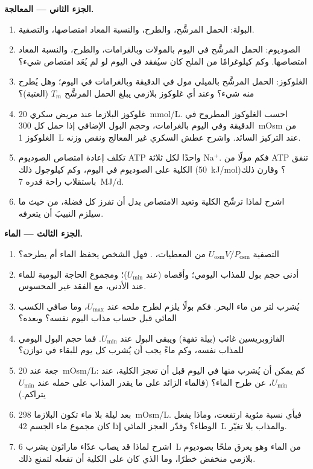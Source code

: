 \begin{problem}
\medskip
\noindent\textbf{الجزء الثاني --- المعالجة.}
\begin{enumerate}[resume]
  \item البولة: الحمل المرشَّح، والطرح، والنسبة المعاد
        امتصاصها، والتصفية.
  \item الصوديوم: الحمل المرشَّح في اليوم بالمولات وبالغرامات،
        والطرح، والنسبة المعاد امتصاصها. وكم كيلوغرامًا من
        الملح كان سيُفقد في اليوم لو لم يُعَد امتصاص شيء؟
  \item الغلوكوز: الحمل المرشَّح بالميلي مول في الدقيقة وبالغرامات في
        اليوم؛ وهل يُطرح منه شيء؟ وعند أي غلوكوز بلازمي يبلغ
        الحمل المرشَّح $T_{m}$ (العتبة)؟
  \item غلوكوز البلازما عند مريض سكري \qty{20}{mmol/L}. احسب
        الغلوكوز المطروح في الدقيقة وفي اليوم بالغرامات، وحجم
        البول الإضافي إذا حمل كل \qty{300}{mOsm} من الغلوكوز
        \qty{1}{L} عند التركيز السائد. واشرح عطش السكري غير
        المعالج ونقص وزنه.
  \item تكلف إعادة امتصاص الصوديوم ATP واحدًا لكل ثلاثة
        Na$^{+}$. فكم مولًا من ATP تنفق الكلية على الصوديوم في
        اليوم، وكم كيلوجول ذلك (\qty{50}{kJ/mol})؟ وقارن ذلك
        باستقلاب راحة قدره \qty{7}{MJ/d}.
  \item اشرح لماذا ترشّح الكلية وتعيد الامتصاص بدل أن تفرز كل
        فضلة، من حيث ما سيلزم النبيبَ أن يتعرفه.
\end{enumerate}

\medskip
\noindent\textbf{الجزء الثالث --- الماء.}
\begin{enumerate}[resume]
  \item التصفية  $U_{\text{osm}}V/P_{\text{osm}}$ من
        المعطيات، . فهل الشخص يحفظ الماء أم
        يطرحه؟
  \item أدنى حجم بول للمذاب اليومي؛ وأقصاه (عند $U_{\min}$)؛
        ومجموع الحاجة اليومية للماء عند الأدنى، مع الفقد غير
        المحسوس.
  \item يُشرب لتر من ماء البحر. فكم بولًا يلزم لطرح ملحه عند
        $U_{\max}$، وما صافي الكسب المائي قبل حساب مذاب اليوم
        نفسه؟ وبعده؟
  \item الفازوبريسين غائب (بيلة تفهة) ويبقى البول عند
        $U_{\min}$. فما حجم البول اليومي للمذاب نفسه، وكم ماءً
        يجب أن يُشرب كل يوم للبقاء في توازن؟
  \item جعة عند \qty{20}{mOsm/L}: كم يمكن أن يُشرب منها في
        اليوم قبل أن تعجز الكلية، عند $U_{\min}$، عن طرح
        الماء؟ (فالماء الزائد على ما يقدر المذاب على حمله عند
        $U_{\min}$ يتراكم.)
  \item بعد ليلة بلا ماء تكون  البلازما \qty{298}{mOsm/L}.
        فبأي نسبة مئوية ارتفعت، وماذا يفعل الوطاء؟ وقدّر
        العجز المائي إذا كان مجموع ماء الجسم \qty{42}{L}
        والمذاب بلا تغيّر.
  \item اشرح لماذا قد يصاب عدّاء ماراثون يشرب \qty{6}{L} من
        الماء وهو يعرق ملحًا بصوديوم بلازمي منخفض خطرًا، وما
        الذي كان على الكلية أن تفعله لتمنع ذلك.
\end{enumerate}


\end{problem}
